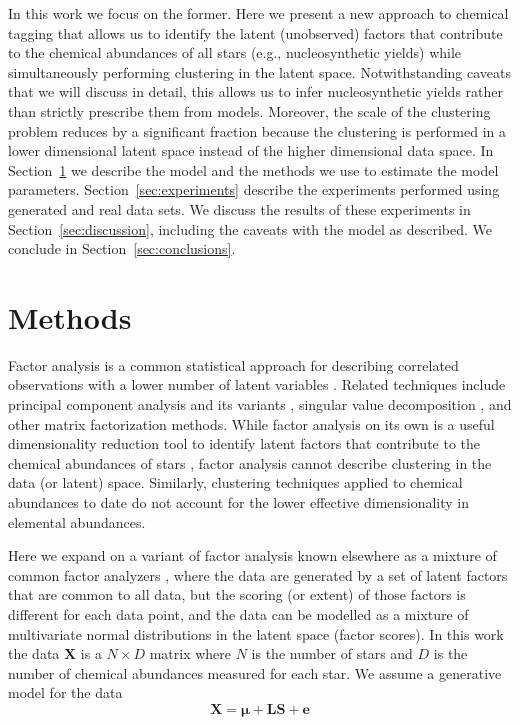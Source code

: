 \documentclass[twocolumn]{aastex62}
\newcommand{\vect}[1]{\boldsymbol{\mathbf{#1}}}
\renewcommand{\vec}[1]{\vect{#1}}
\newcommand{\vecdataunscaled}{\vec{X}}
\newcommand{\factorloads}{\textbf{L}}
\newcommand{\factorscores}{\textbf{S}}
\newcommand{\NumData}{N}
\newcommand{\NumDimensions}{D}
\begin{document}
In this work we focus on the former.
Here we present a new approach to chemical tagging that allows us to identify 
the latent (unobserved) factors that contribute to the chemical abundances of 
all stars (e.g., nucleosynthetic yields) while simultaneously performing 
clustering in the latent space. Notwithstanding caveats that we will
discuss in detail, this allows us to infer nucleosynthetic yields rather than
strictly prescribe them from models. Moreover, the scale of the clustering
problem reduces by a significant fraction because the clustering is performed in
a lower dimensional latent space instead of the higher dimensional data space.
In Section~\ref{sec:methods} we describe the model and the methods we use to
estimate the model parameters. Section~\ref{sec:experiments} describe the 
experiments performed using generated and real data sets. We discuss the results
of these experiments in Section~\ref{sec:discussion}, including the caveats with
the model as described. We conclude in Section~\ref{sec:conclusions}.



\section{Methods} \label{sec:methods}

Factor analysis is a common statistical approach for describing correlated 
observations with a lower number of latent variables \citep[e.g.,][]{Thompson:2004}.
Related techniques include principal component analysis \citep{Hotelling:1933} and its
variants \citep{Tipping;Bishop:1999}, singular value decomposition \citep{Golub:1970}, and other
matrix factorization methods. While factor analysis on its own is a useful
dimensionality reduction tool to identify latent factors that contribute to
the chemical abundances of stars \citep[e.g.,][]{Ting:2012,Price-Jones:2018}, factor
analysis cannot describe clustering in the data (or latent) space.
Similarly, clustering techniques applied to chemical abundances to date 
\citep[e.g.,][]{Hogg:2016} do not account for the lower effective dimensionality in
elemental abundances.

Here we expand on a variant of factor analysis known elsewhere as a mixture of common 
factor analyzers \citep{Baek:2010}, where the data are generated by a set of 
latent factors that are common to all data, but the scoring (or extent) of those
factors is different for each data point, and the data can be modelled as a
mixture of multivariate normal distributions in the latent space (factor scores).
In this work the data $\vecdataunscaled$ is a 
$\NumData \times \NumDimensions$ matrix where $\NumData$ is the number of 
stars and $\NumDimensions$ is the number of chemical abundances measured 
for each star. We assume a generative model for the data 
\begin{equation}
	\vecdataunscaled = \vec\mu + \factorloads\factorscores + \vec{e}
	\label{eq:generative-model}
\end{equation}
\end{document}
